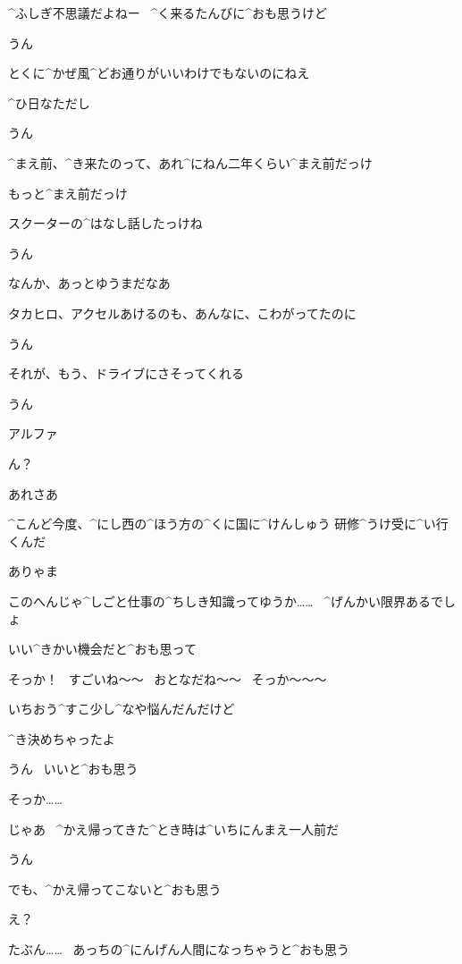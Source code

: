 \Alpha ^{ふしぎ}{不思議}だよねー
\ ^{く}{来}るたんびに^{おも}{思}うけど

\Takahiro うん

\Alpha とくに^{かぜ}{風}^{どお}{通}りがいいわけでもないのにねえ

\Alpha ^{ひ}{日}なただし

\Takahiro うん

\page[138]
\Alpha ^{まえ}{前}、^{き}{来}たのって、あれ^{にねん}{二年}くらい^{まえ}{前}だっけ

\Alpha もっと^{まえ}{前}だっけ

\Alpha スクーターの^{はなし}{話}したっけね

\Takahiro うん

\page[139]
\Alpha なんか、あっとゆうまだなあ

\Alpha タカヒロ、アクセルあけるのも、あんなに、こわがってたのに

\Takahiro うん

\Alpha それが、もう、ドライブにさそってくれる

\Takahiro うん

\page[140]
\Takahiro アルファ

\Alpha ん？

\Takahiro あれさあ

\Takahiro ^{こんど}{今度}、^{にし}{西}の^{ほう}{方}の^{くに}{国}に^{けんしゅう }{研修}^{うけ}{受}に^{い}{行}くんだ

\Alpha ありゃま

\Takahiro このへんじゃ^{しごと}{仕事}の^{ちしき}{知識}ってゆうか……
\ ^{げんかい}{限界}あるでしょ

\Takahiro いい^{きかい}{機会}だと^{おも}{思}って

\Alpha そっか！
\ すごいね〜〜
\ おとなだね〜〜
\ そっか〜〜〜

\page[141]
\Takahiro いちおう^{すこ}{少}し^{なや}{悩}んだんだけど

\Takahiro ^{き}{決}めちゃったよ

\Alpha うん
\ いいと^{おも}{思}う

\Alpha そっか……

\Alpha じゃあ
\ ^{かえ}{帰}ってきた^{とき}{時}は^{いちにんまえ}{一人前}だ

\Takahiro うん

\page[142]
\Takahiro でも、^{かえ}{帰}ってこないと^{おも}{思}う

\Alpha え？

\Takahiro たぶん……
\ あっちの^{にんげん}{人間}になっちゃうと^{おも}{思}う

